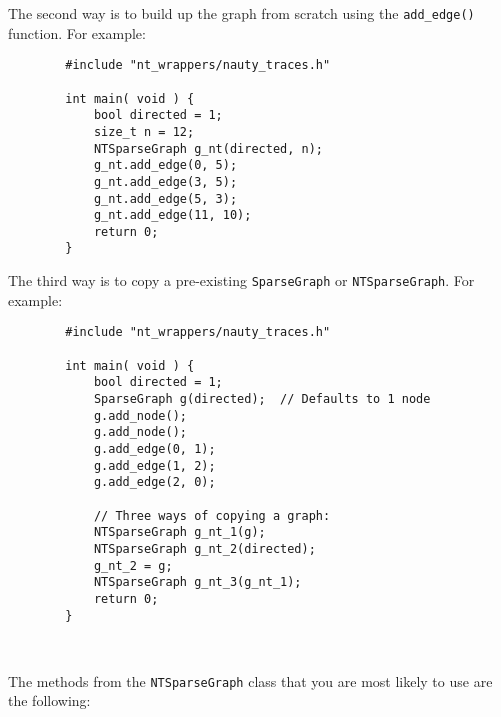 \documentclass{article}
\begin{document}
The second way is to build up the graph from scratch using the \verb|add_edge()| function. For example:

\vspace{-0.2cm}

\begin{verbatim}
        #include "nt_wrappers/nauty_traces.h"
        
        int main( void ) {
            bool directed = 1;
            size_t n = 12;
            NTSparseGraph g_nt(directed, n);
            g_nt.add_edge(0, 5);
            g_nt.add_edge(3, 5);
            g_nt.add_edge(5, 3);
            g_nt.add_edge(11, 10);
            return 0;
        }
\end{verbatim}

The third way is to copy a pre-existing \verb|SparseGraph| or \verb|NTSparseGraph|. For example:

\vspace{-0.2cm}

\begin{verbatim}
        #include "nt_wrappers/nauty_traces.h"
        
        int main( void ) {
            bool directed = 1;
            SparseGraph g(directed);  // Defaults to 1 node
            g.add_node();
            g.add_node();
            g.add_edge(0, 1);
            g.add_edge(1, 2);
            g.add_edge(2, 0);

            // Three ways of copying a graph:
            NTSparseGraph g_nt_1(g);
            NTSparseGraph g_nt_2(directed);
            g_nt_2 = g;
            NTSparseGraph g_nt_3(g_nt_1);
            return 0;
        }
\end{verbatim}

\ 

\vspace{-1cm}

The methods from the \verb|NTSparseGraph| class that you are most likely to use are the following:
\end{document}
